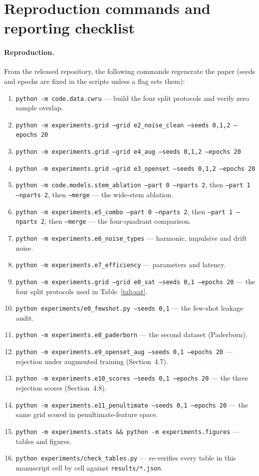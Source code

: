\appendix
\section{Reproduction commands and reporting checklist}

\paragraph{Reproduction.} From the released repository, the following commands regenerate the paper (seeds and epochs are fixed in the scripts unless a flag sets them):
\begin{enumerate}\raggedright
\item \texttt{python -m code.data.cwru} --- build the four split protocols and verify zero sample overlap.
\item \texttt{python -m experiments.grid --grid e2\_noise\_clean --seeds 0,1,2 --epochs 20}
\item \texttt{python -m experiments.grid --grid e4\_aug --seeds 0,1,2 --epochs 20}
\item \texttt{python -m experiments.grid --grid e3\_openset --seeds 0,1,2 --epochs 20}
\item \texttt{python -m code.models.stem\_ablation --part 0 --nparts 2}, then \texttt{--part 1 --nparts 2}, then \texttt{--merge} --- the wide-stem ablation.
\item \texttt{python -m experiments.e5\_combo --part 0 --nparts 2}, then \texttt{--part 1 --nparts 2}, then \texttt{--merge} --- the four-quadrant comparison.
\item \texttt{python -m experiments.e6\_noise\_types} --- harmonic, impulsive and drift noise.
\item \texttt{python -m experiments.e7\_efficiency} --- parameters and latency.
\item \texttt{python -m experiments.grid --grid e0\_sat --seeds 0,1 --epochs 20} --- the four split protocols used in Table~\ref{tab:sat}.
\item \texttt{python experiments/e0\_fewshot.py --seeds 0,1} --- the few-shot leakage audit.
\item \texttt{python -m experiments.e8\_paderborn} --- the second dataset (Paderborn).
\item \texttt{python -m experiments.e9\_openset\_aug --seeds 0,1 --epochs 20} --- rejection under augmented training (Section~4.7).
\item \texttt{python -m experiments.e10\_scores --seeds 0,1 --epochs 20} --- the three rejection scores (Section~4.8).
\item \texttt{python -m experiments.e11\_penultimate --seeds 0,1 --epochs 20} --- the same grid scored in penultimate-feature space.
\item \texttt{python -m experiments.stats \&\& python -m experiments.figures} --- tables and figures.
\item \texttt{python experiments/check\_tables.py} --- re-verifies every table in this manuscript cell by cell against \texttt{results/*.json}.
\end{enumerate}
